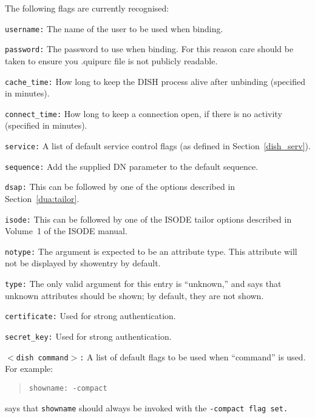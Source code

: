 The following flags are currently recognised:
\begin{describe}

\item [\tt username:] The name of the user to be used when binding.

\item [\tt password:] The password to use when binding.  For this reason care
should be taken to ensure you .quipurc file is not publicly readable.

\item [\tt cache\_time:] How long to keep the DISH process alive after unbinding
(specified in minutes).

\item [\tt connect\_time:] How long to keep a connection open, if there is no
activity (specified in minutes).

\item [\tt service:] A list of default service control flags 
(as defined in Section~\ref{dish_serv}).

\item [\tt sequence:] Add the supplied DN parameter to the default sequence.

\item [\tt dsap:] This can be followed by one of the 
options
described in Section~\ref{dua:tailor}.

\item [\tt isode:] 
This can be followed by one of the ISODE tailor options
described in Volume~1 of the ISODE manual.

\item [\tt notype:] The argument is expected to be an attribute type.
This attribute will not be displayed by showentry by default.

\item [\tt type:] The only valid argument for this entry is ``unknown,'' and says 
that unknown attributes should be shown; by default, they are not shown.

\item [\tt certificate:] Used for strong authentication.

\item [\tt secret\_key:] Used for strong authentication.

\item [\tt $<$dish command$>$:] A list of default flags 
to be used when ``command'' is used.
For example:
\begin{quote}\begin{verbatim}
showname: -compact
\end{verbatim}\end{quote}
says that \verb|showname| should always be invoked with the 
\tt -compact\rm \ flag set.


\end{describe}

